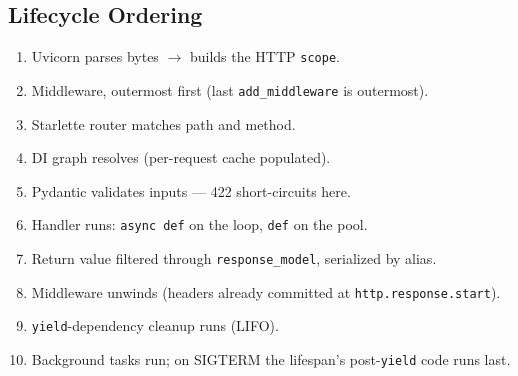 \subsection*{Lifecycle Ordering}
\begin{enumerate}
  \item Uvicorn parses bytes $\to$ builds the HTTP \texttt{scope}.
  \item Middleware, outermost first (last \texttt{add\_middleware} is outermost).
  \item Starlette router matches path and method.
  \item DI graph resolves (per-request cache populated).
  \item Pydantic validates inputs --- 422 short-circuits here.
  \item Handler runs: \texttt{async def} on the loop, \texttt{def} on the pool.
  \item Return value filtered through \texttt{response\_model}, serialized by alias.
  \item Middleware unwinds (headers already committed at
        \texttt{http.response.start}).
  \item \texttt{yield}-dependency cleanup runs (LIFO).
  \item Background tasks run; on SIGTERM the lifespan's post-\texttt{yield}
        code runs last.
\end{enumerate}



